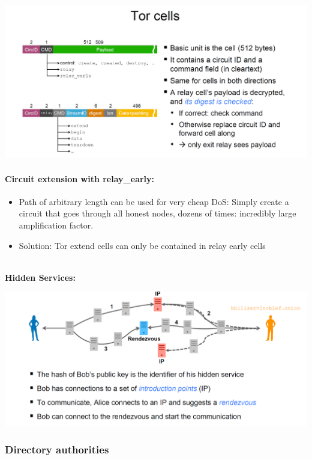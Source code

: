 \begin{minipage}{\linewidth}
    \centering      
    \includegraphics[width=\linewidth]{Figures/Anym_tor_cell.PNG} 
\end{minipage}

\paragraph{Circuit extension with relay\_early:}
\begin{itemize}
    \item Path of arbitrary length can be used for very cheap DoS: Simply create a circuit that goes through all honest nodes, dozens of times: incredibly large amplification factor.
    \item Solution: Tor extend cells can only be contained in relay early cells
\end{itemize}
\\
\textbf{Hidden Services:}\\
\begin{minipage}{\linewidth}
    \centering      
    \includegraphics[width=\linewidth]{Figures/Anym_hidden_services.PNG} 
\end{minipage}

\subsubsection{Directory authorities}

